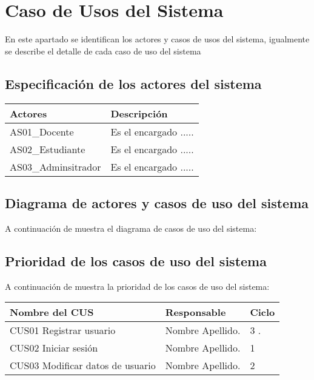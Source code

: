 \chapter{Caso de Usos del Sistema}

En este apartado se identifican los actores y casos de usos del sistema, igualmente se describe 
el detalle de cada caso de uso del sistema


\section{Especificación de los actores del sistema}


	\begin{table}[h!]	
		\begin{tabular}{ |p{4cm}|p{9cm}| }	\hline
			
			\rowcolor{gray!50}  \textbf{Actores}  &  \textbf{Descripción} \\ \hline
			
			AS01\_Docente & Es el encargado .....  \\	\hline
			
			AS02\_Estudiante & Es el encargado .....  \\	\hline
			
			AS03\_Adminsitrador & Es el encargado .....  \\	\hline
			
		\end{tabular}
	\end{table}	


\section{Diagrama de actores y casos de uso del sistema}

A continuación de muestra el diagrama de casos de uso del sistema:

 
\section{Prioridad de los casos de uso del sistema}

A continuación de muestra la prioridad de los casos de uso del sistema:
	\begin{table}[h!]	
		\begin{tabular}{ |p{4cm}|p{7cm}|p{3cm}| }	\hline
			
			\rowcolor{gray!50}  \textbf{Nombre del CUS}  &  \textbf{Responsable } &  \textbf{Ciclo } \\ \hline
			
			CUS01 Registrar usuario  &  Nombre Apellido. &  3 .  \\	\hline
			
			CUS02 Iniciar sesión  &  Nombre Apellido. &  1   \\	\hline
		
			CUS03 Modificar datos de usuario  &  Nombre Apellido. &  2   \\	\hline
			
		\end{tabular}
	\end{table}	


